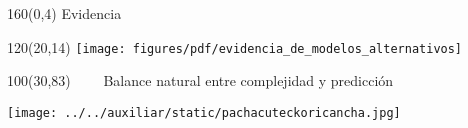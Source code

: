 \documentclass[shownotes,aspectratio=169]{beamer}
\begin{document}
% 
% 
% 
% 
% 
% 
% 
% 
% 
% 
% 
% 
% 



\begin{frame}[plain]
\begin{textblock}{160}(0,4)
\centering \Large  Evidencia
\end{textblock}


 \begin{textblock}{120}(20,14)
  \centering
  \texttt{[image: figures/pdf/evidencia\_de\_modelos\_alternativos]} 
 \end{textblock} 
 
 
 \begin{textblock}{100}(30,83)
  \centering
 \ \ \ \  Balance natural entre complejidad y predicci\'on
  \end{textblock}
\end{frame}


\begin{frame}[plain]

\centering
  \texttt{[image: ../../auxiliar/static/pachacuteckoricancha.jpg]}
\end{frame}
\end{document}
